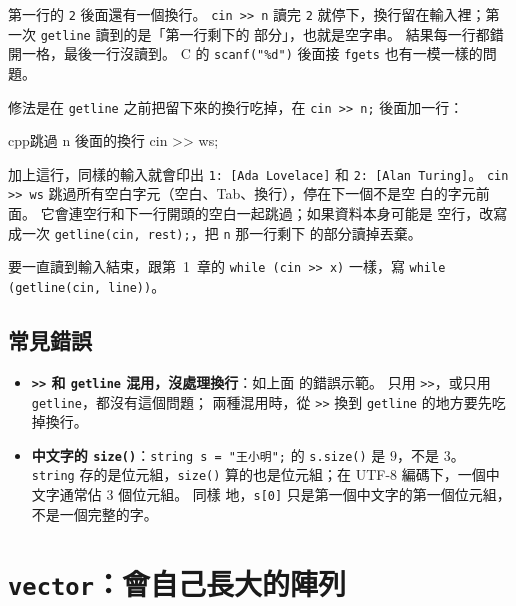 
第一行的 \texttt{2} 後面還有一個換行。 \texttt{cin >> n} 讀完 \texttt{2}
就停下，換行留在輸入裡；第一次 \texttt{getline} 讀到的是「第一行剩下的
部分」，也就是空字串。 結果每一行都錯開一格，最後一行沒讀到。 C 的
\texttt{scanf("\%d")} 後面接 \texttt{fgets} 也有一模一樣的問題。

修法是在 \texttt{getline} 之前把留下來的換行吃掉，在 \texttt{cin >> n;}
後面加一行：

\begin{code}{cpp}{跳過 n 後面的換行}
cin >> ws;
\end{code}

加上這行，同樣的輸入就會印出 \texttt{1: [Ada Lovelace]} 和
\texttt{2: [Alan Turing]}。
\texttt{cin >> ws} 跳過所有空白字元（空白、Tab、換行），停在下一個不是空
白的字元前面。 它會連空行和下一行開頭的空白一起跳過；如果資料本身可能是
空行，改寫成一次 \texttt{getline(cin, rest);}，把 \texttt{n} 那一行剩下
的部分讀掉丟棄。

要一直讀到輸入結束，跟第~1~章的 \texttt{while (cin >> x)} 一樣，寫
\texttt{while (getline(cin, line))}。

\subsection{常見錯誤}

\begin{itemize}
\item \textbf{\texttt{>>} 和 \texttt{getline} 混用，沒處理換行}：如上面
的錯誤示範。 只用 \texttt{>>}，或只用 \texttt{getline}，都沒有這個問題；
兩種混用時，從 \texttt{>>} 換到 \texttt{getline} 的地方要先吃掉換行。
\item \textbf{中文字的 \texttt{size()}}：\texttt{string s = "王小明";}
的 \texttt{s.size()} 是 $9$，不是 $3$。 \texttt{string} 存的是位元組，\texttt{size()}
算的也是位元組；在 UTF-8 編碼下，一個中文字通常佔 $3$ 個位元組。 同樣
地，\texttt{s[0]} 只是第一個中文字的第一個位元組，不是一個完整的字。
\end{itemize}

\section{\texttt{vector}：會自己長大的陣列}
\label{sec:vector}

